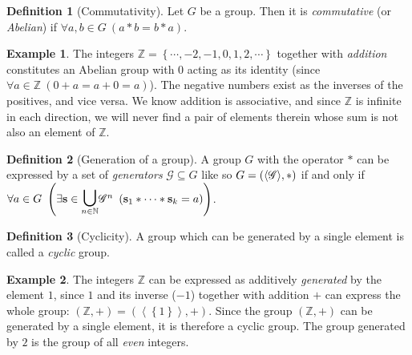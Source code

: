 \documentclass[a4paper,twoside,12pt,openany]{report}
\theoremstyle{plain}
\theoremstyle{definition}
\newtheorem{definition}{Definition}
\newtheorem{example}{Example}
\theoremstyle{remark}
\newtheorem{remark}{Remark}
\begin{document}
\begin{definition}[Commutativity]
	Let \(G\) be a group. Then it is \emph{commutative} (or \emph{Abelian}) if \(\forall a,b\in G\ (a*b=b*a)\).
\end{definition}


\begin{example}
	The integers \(\mathbb{Z}=\left\{\cdots,-2,-1,0,1,2,\cdots\right\}\) together with \textit{addition} constitutes an Abelian group with \(0\) acting as its identity (since \(\forall a\in \mathbb{Z}\ \left(0+a=a+0=a\right)\)). The negative numbers exist as the inverses of the positives, and vice versa.
	We know addition is associative, and since \(\mathbb{Z}\) is infinite in each direction, we will never find a pair of elements therein whose sum is not also an element of \(\mathbb{Z}\).
\end{example}

\begin{definition}[Generation of a group]
    A group \(G\) with the operator \(*\) can be expressed by a set of \emph{generators} \(\mathscr{G}\subseteq G\) like so \(G=\left(\langle \mathscr{G} \rangle, *\right)\) if and only if \(\foralll{a\in G}{\existss{\mathbf{s}\in \underset{n\in\mathbb{N}}{\bbigcup}\mathscr{G}^n}{\mathbf{s}_1*\cdots*\mathbf{s}_k=a}}\).
\end{definition}

\begin{definition}[Cyclicity]
	A group which can be generated by a single element is called a \emph{cyclic} group.
\end{definition}

\begin{example}
	The integers \(\mathbb{Z}\) can be expressed as additively \textit{generated} by the element \(1\), since \(1\) and its inverse (\(-1\)) together with addition \(+\) can express the whole group: \(\left(\mathbb{Z},+\right)=\left(\left\langle\left\{ 1 \right\}\right\rangle,+\right)\). Since the group \((\mathbb{Z},+)\) can be generated by a single element, it is therefore a cyclic group. The group generated by \(2\) is the group of all \textit{even} integers.
\end{example}
\end{document}
